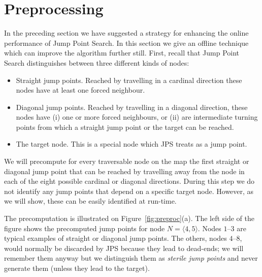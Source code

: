 \section{Preprocessing}
\label{sec::preprocessing}
In the preceding section we have suggested a strategy for enhancing the
online performance of Jump Point Search.  In this section we give an offline
technique which can improve the algorithm further still. First, recall that 
Jump Point Search distinguishes between three different kinds of
nodes:
\begin{itemize}
\item Straight jump points. Reached by travelling in a
cardinal direction these nodes have at least one forced neighbour.
\item Diagonal jump points. Reached by travelling in a diagonal direction, 
these nodes have (i) one or more forced neighbours, or (ii) are 
intermediate turning points from which a straight jump point or the 
target can be reached.
\item The target node. This is a special node which JPS treats as a jump point.
\end{itemize}

We will precompute for every traversable node on the map the first
straight or diagonal jump point that can be reached by travelling 
away from the node in each of the eight possible cardinal or diagonal 
directions. During this step we do not identify any jump points that 
depend on a specific target node.  However, as we will show, these 
can be easily identified at run-time. 


The precomputation is illustrated on Figure~\ref{fig:preproc}(a).
The left side of the figure shows the precomputed jump points 
for node $N = \langle 4,5\rangle$.  
Nodes $1$--$3$ are typical examples of straight or diagonal 
jump points.  
The others, nodes $4$--$8$, would normally be discarded 
by JPS because they lead to dead-ends; we will remember them 
anyway but we distinguish them as \emph{sterile jump points} and never
generate them (unless they lead to the target).

